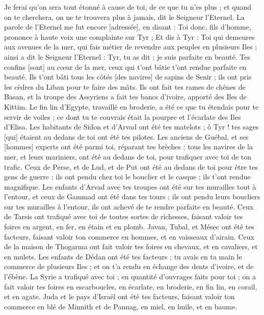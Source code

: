 \begin{multicols}{2}
Je ferai qu'on sera tout étonné à cause de toi, de ce que tu n'es plus ; et quand on te cherchera, on ne te trouvera plus à jamais, dit le Seigneur l'Eternel.
\VerseOne{}La parole de l'Eternel me fut encore [adressée], en disant :
Toi donc, fils d'homme, prononce à haute voix une complainte sur Tyr ;
Et dis à Tyr : Toi qui demeures aux avenues de la mer, qui fais métier de revendre aux peuples en plusieurs Iles ; ainsi a dit le Seigneur l'Eternel : Tyr, tu as dit : je suis parfaite en beauté.
Tes confins [sont] au cœur de la mer, ceux qui t'ont bâtie t'ont rendue parfaite en beauté.
Ils t'ont bâti tous les côtés [des navires] de sapins de Senir ; ils ont pris les cèdres du Liban pour te faire des mâts.
Ils ont fait tes rames de chênes de Basan, et la troupe des Assyriens a fait tes bancs d'ivoire, apporté des Iles de Kittim.
Le fin lin d'Egypte, travaillé en broderie, a été ce que tu étendais pour te servir de voiles ; ce dont tu te couvrais était la pourpre et l'écarlate des Iles d'Elisa.
Les habitants de Sidon et d'Arvad ont été tes matelots ; ô Tyr ! tes sages [qui] étaient au dedans de toi ont été tes pilotes.
Les anciens de Guébal, et ses [hommes] experts ont été parmi toi, réparant tes brèches ; tous les navires de la mer, et leurs mariniers, ont été au dedans de toi, pour trafiquer avec toi de ton trafic.
Ceux de Perse, et de Lud, et de Put ont été au dedans de toi pour être tes gens de guerre ; ils ont pendu chez toi le bouclier et le casque ; ils t'ont rendue magnifique.
Les enfants d'Arvad avec tes troupes ont été sur tes murailles tout à l'entour, et ceux de Gammad ont été dans tes tours ; ils ont pendu leurs boucliers sur tes murailles à l'entour, ils ont achevé de te rendre parfaite en beauté.
Ceux de Tarsis ont trafiqué avec toi de toutes sortes de richesses, faisant valoir tes foires en argent, en fer, en étain et en plomb.
Javan, Tubal, et Mésec ont été tes facteurs, faisant valoir ton commerce en hommes, et en vaisseaux d'airain.
Ceux de la maison de Thogarma ont fait valoir tes foires en chevaux, et en cavaliers, et en mulets.
Les enfants de Dédan ont été tes facteurs ; tu avais en ta main le commerce de plusieurs Iles ; et on t'a rendu en échange des dents d'ivoire, et de l'ébène.
La Syrie a trafiqué avec toi ; en quantité d'ouvrages faits pour toi ; on a fait valoir tes foires en escarboucles, en écarlate, en broderie, en fin lin, en corail, et en agate.
Juda et le pays d'Israël ont été tes facteurs, faisant valoir ton commerce en blé de Minnith et de Pannag, en miel, en huile, et en baume.

\end{multicols}
